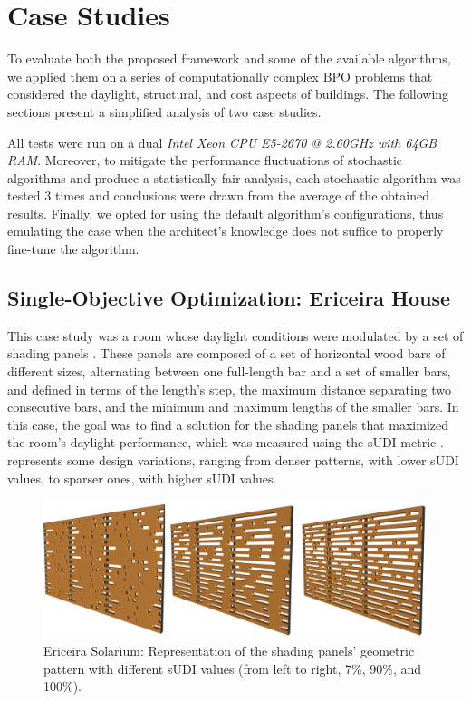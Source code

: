 \section{Case Studies}
\label{sec:resul}
To evaluate both the proposed framework and some of the available algorithms, we applied them on a series of computationally complex \ac{BPO} problems that considered the daylight, structural, and cost aspects of buildings. The following sections present a simplified analysis of two case studies.

All tests were run on a dual \textit{Intel Xeon CPU E5-2670 @ 2.60GHz with 64GB RAM}. Moreover, to mitigate the performance fluctuations of stochastic algorithms and produce a statistically fair analysis, each stochastic algorithm was tested $3$ times and conclusions were drawn from the average of the obtained results. Finally, we opted for using the default algorithm's configurations, thus emulating the case when the architect's knowledge does not suffice to properly fine-tune the algorithm. 

\subsection{Single-Objective Optimization: Ericeira House}
This case study was a room whose daylight conditions were modulated by a set of shading panels \cite{Caetano2018}. These panels are composed of a set of horizontal wood bars of different sizes, alternating between one full-length bar and a set of smaller bars, and defined in terms of the length’s step, the maximum distance separating two consecutive bars, and the minimum and maximum lengths of the smaller bars. In this case, the goal was to find a solution for the shading panels that maximized the room's daylight performance, which was measured using the \ac{sUDI} metric \cite{Nabil2006}.   represents some design variations, ranging from denser patterns, with lower \ac{sUDI} values, to sparser ones, with higher \ac{sUDI} values.

\begin{figure}[htpb]
	\centering
	\includegraphics[width=\columnwidth]{../report/Images/Evaluation/ericeira_extended_abstract.png}
	\caption{Ericeira Solarium: Representation of the shading panels’ geometric pattern with different sUDI values (from left to right, 7\%, 90\%, and 100\%).}
	\label{fig:ericeira_multiple_panels}
\end{figure}

